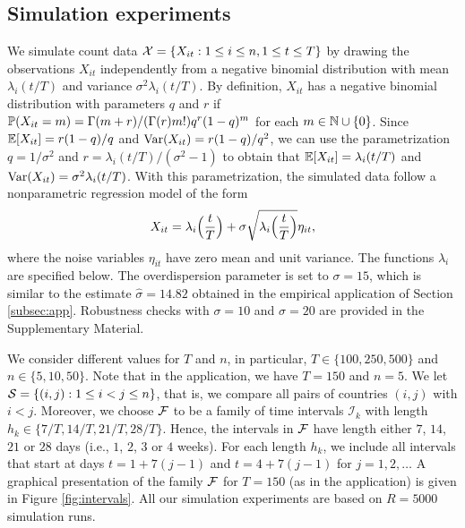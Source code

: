 \documentclass[a4paper,12pt]{article}
\numberwithin{equation}{section}
\begin{document}
\subsection{Simulation experiments}\label{subsec:sim}


We simulate count data $\mathcal{X} = \{ X_{it}: 1 \le i \le n, 1 \le t \le T \}$ by drawing the observations $X_{it}$ independently from a negative binomial distribution with mean $\lambda_i(t/T)$ and variance $\sigma^2 \lambda_i(t/T)$. By definition, $X_{it}$ has a negative binomial distribution with para\-meters $q$ and $r$ if $\mathbb{P}(X_{it} = m) = \Gamma(m+r) / (\Gamma(r) m!) q^r (1-q)^m$ for each $m \in \mathbb{N} \cup \{0\}$. Since $\mathbb{E}[X_{it}] = r (1-q)/q$ and $\textnormal{Var}(X_{it}) = r(1-q)/q^2$, we can use the parametrization $q = 1/\sigma^2$ and $r = \lambda_i(t/T) / (\sigma^2 - 1)$ to obtain that $\mathbb{E}[X_{it}] = \lambda_i(t/T)$ and $\textnormal{Var}(X_{it}) = \sigma^2 \lambda_i(t/T)$. With this parametrization, the simulated data follow a nonparametric regression model of the form 
\[ X_{it} = \lambda_i\Big(\frac{t}{T}\Big) + \sigma \sqrt{\lambda_i\Big(\frac{t}{T}\Big)} \eta_{it}, \]
where the noise variables $\eta_{it}$ have zero mean and unit variance. The functions $\lambda_i$ are specified below. The overdispersion parameter is set to $\sigma = 15$, which is similar to the estimate {\color{red}$\hat{\sigma} = 14.82$} obtained in the empirical application of Section \ref{subsec:app}. Robustness checks with $\sigma=10$ and $\sigma=20$ are provided in the Supplementary Material.


We consider different values for $T$ and $n$, in particular, $T \in \{100,250, 500\}$ and $n \in \{5,10,50\}$. Note that in the application, we have {\color{red}$T=150$} and $n=5$. We let $\mathcal{S} = \{ (i,j): 1 \le i < j \le n\}$, that is, we compare all pairs of countries $(i,j)$ with $i < j$. Moreover, we choose $\mathcal{F}$ to be a family of time intervals $\mathcal{I}_k$ with length $h_k \in \{ 7/T,14/T,21/T,28/T \}$. Hence, the intervals in $\mathcal{F}$ have length either $7$, $14$, $21$ or $28$ days (i.e., $1$, $2$, $3$ or $4$ weeks). For each length $h_k$, we include all intervals that start at days $t = 1 + 7(j-1)$ and $t = 4 + 7(j-1)$ for $j=1,2,\ldots$ A graphical presentation of the family $\mathcal{F}$ for {\color{red} $T = 150$} (as in the application) is given in Figure \ref{fig:intervals}. All our simulation experiments are based on $R=5000$ simulation runs. 
\end{document}
